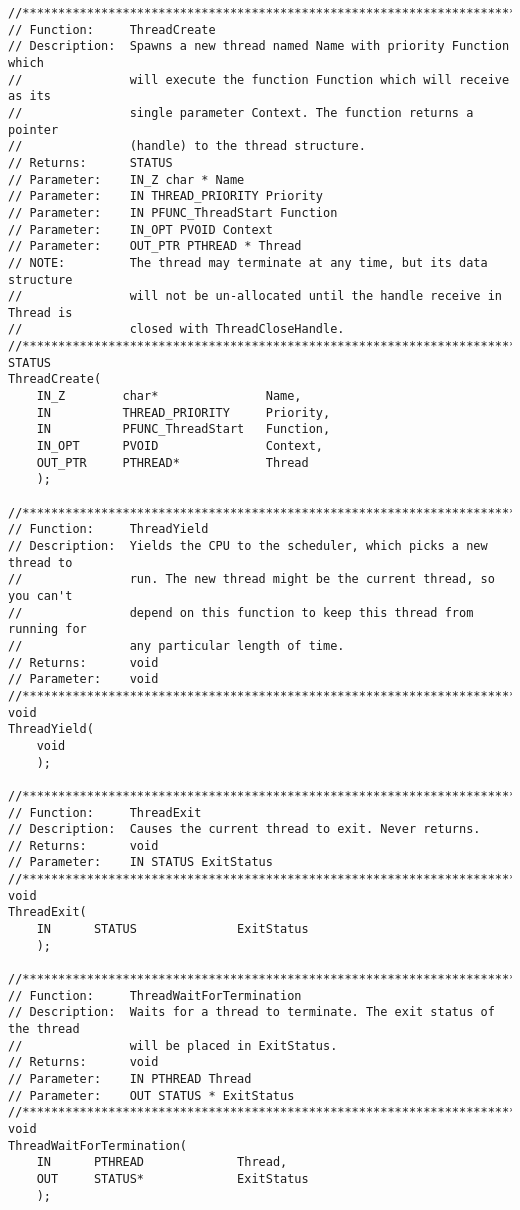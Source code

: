 \begin{appendices}
\begin{lstlisting}[caption={Thread Public Interface},label={lst:ThPublicFuncs}]
//******************************************************************************
// Function:     ThreadCreate
// Description:  Spawns a new thread named Name with priority Function which
//               will execute the function Function which will receive as its
//               single parameter Context. The function returns a pointer
//               (handle) to the thread structure.
// Returns:      STATUS
// Parameter:    IN_Z char * Name
// Parameter:    IN THREAD_PRIORITY Priority
// Parameter:    IN PFUNC_ThreadStart Function
// Parameter:    IN_OPT PVOID Context
// Parameter:    OUT_PTR PTHREAD * Thread
// NOTE:         The thread may terminate at any time, but its data structure
//               will not be un-allocated until the handle receive in Thread is
//               closed with ThreadCloseHandle.
//******************************************************************************
STATUS
ThreadCreate(
    IN_Z        char*               Name,
    IN          THREAD_PRIORITY     Priority,
    IN          PFUNC_ThreadStart   Function,
    IN_OPT      PVOID               Context,
    OUT_PTR     PTHREAD*            Thread
    );

//******************************************************************************
// Function:     ThreadYield
// Description:  Yields the CPU to the scheduler, which picks a new thread to
//               run. The new thread might be the current thread, so you can't
//               depend on this function to keep this thread from running for
//               any particular length of time.
// Returns:      void
// Parameter:    void
//******************************************************************************
void
ThreadYield(
    void
    );

//******************************************************************************
// Function:     ThreadExit
// Description:  Causes the current thread to exit. Never returns.
// Returns:      void
// Parameter:    IN STATUS ExitStatus
//******************************************************************************
void
ThreadExit(
    IN      STATUS              ExitStatus
    );

//******************************************************************************
// Function:     ThreadWaitForTermination
// Description:  Waits for a thread to terminate. The exit status of the thread
//               will be placed in ExitStatus.
// Returns:      void
// Parameter:    IN PTHREAD Thread
// Parameter:    OUT STATUS * ExitStatus
//******************************************************************************
void
ThreadWaitForTermination(
    IN      PTHREAD             Thread,
    OUT     STATUS*             ExitStatus
    );


\end{lstlisting}
\end{appendices}
